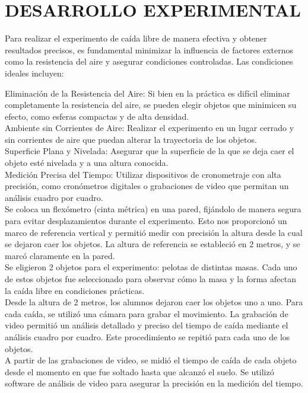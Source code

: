 \documentclass[journal]{IEEEtran}
\begin{document}
\section{DESARROLLO EXPERIMENTAL}

Para realizar el experimento de caída libre de manera efectiva y obtener resultados precisos, es fundamental minimizar la influencia de factores externos como la resistencia del aire y asegurar condiciones controladas. Las condiciones ideales incluyen:

Eliminación de la Resistencia del Aire: Si bien en la práctica es difícil eliminar completamente la resistencia del aire, se pueden elegir objetos que minimicen su efecto, como esferas compactas y de alta densidad.\\
Ambiente sin Corrientes de Aire: Realizar el experimento en un lugar cerrado y sin corrientes de aire que puedan alterar la trayectoria de los objetos.\\
Superficie Plana y Nivelada: Asegurar que la superficie de la que se deja caer el objeto esté nivelada y a una altura conocida.\\
Medición Precisa del Tiempo: Utilizar dispositivos de cronometraje con alta precisión, como cronómetros digitales o grabaciones de video que permitan un análisis cuadro por cuadro.\\

Se coloca un flexómetro (cinta métrica) en una pared, fijándolo de manera segura para evitar desplazamientos durante el experimento. Esto nos proporcionó un marco de referencia vertical y permitió medir con precisión la altura desde la cual se dejaron caer los objetos.
La altura de referencia se estableció en 2 metros, y se marcó claramente en la pared.\\

Se eligieron 2 objetos para el experimento: pelotas de distintas masas.
Cada uno de estos objetos fue seleccionado para observar cómo la masa y la forma afectan la caída libre en condiciones prácticas.\\

Desde la altura de 2 metros, los alumnos dejaron caer los objetos uno a uno.
Para cada caída, se utilizó una cámara para grabar el movimiento. La grabación de video permitió un análisis detallado y preciso del tiempo de caída mediante el análisis cuadro por cuadro.
Este procedimiento se repitió para cada uno de los objetos.\\

A partir de las grabaciones de video, se midió el tiempo de caída de cada objeto desde el momento en que fue soltado hasta que alcanzó el suelo.
Se utilizó software de análisis de video para asegurar la precisión en la medición del tiempo.\\
\end{document}
